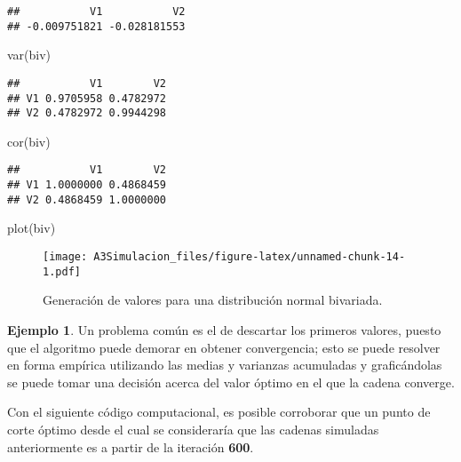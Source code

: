 \documentclass[
  spanish,
]{book}
\newenvironment{Shaded}{\begin{snugshade}}{\end{snugshade}}
\newcommand{\FunctionTok}[1]{\textcolor[rgb]{0.00,0.00,0.00}{#1}}
\newcommand{\NormalTok}[1]{#1}
\theoremstyle{definition}
\theoremstyle{definition}
\newtheorem{example}{Ejemplo}[chapter]
\theoremstyle{definition}
\theoremstyle{definition}
\theoremstyle{remark}
\begin{document}
\begin{verbatim}
##           V1           V2 
## -0.009751821 -0.028181553
\end{verbatim}

\begin{Shaded}
\begin{Highlighting}[]
\FunctionTok{var}\NormalTok{(biv)}
\end{Highlighting}
\end{Shaded}

\begin{verbatim}
##           V1        V2
## V1 0.9705958 0.4782972
## V2 0.4782972 0.9944298
\end{verbatim}

\begin{Shaded}
\begin{Highlighting}[]
\FunctionTok{cor}\NormalTok{(biv)}
\end{Highlighting}
\end{Shaded}

\begin{verbatim}
##           V1        V2
## V1 1.0000000 0.4868459
## V2 0.4868459 1.0000000
\end{verbatim}

\begin{Shaded}
\begin{Highlighting}[]
\FunctionTok{plot}\NormalTok{(biv)}
\end{Highlighting}
\end{Shaded}

\begin{figure}
\centering
\texttt{[image: A3Simulacion\_files/figure-latex/unnamed-chunk-14-1.pdf]}
\caption{\label{fig:unnamed-chunk-14}Generación de valores para una distribución normal bivariada.}
\end{figure}

\begin{example}
\protect\hypertarget{exm:unnamed-chunk-15}{}{\label{exm:unnamed-chunk-15} }Un problema común es el de descartar los primeros valores, puesto que el algoritmo puede demorar en obtener convergencia;
esto se puede resolver en forma empírica utilizando las medias y varianzas acumuladas y graficándolas se puede tomar una decisión acerca del valor óptimo en el que la cadena converge.

Con el siguiente código computacional, es posible corroborar que un punto de corte óptimo desde el cual se consideraría que las cadenas simuladas anteriormente es a partir de la iteración \textbf{600}.
\end{example}
\end{document}

